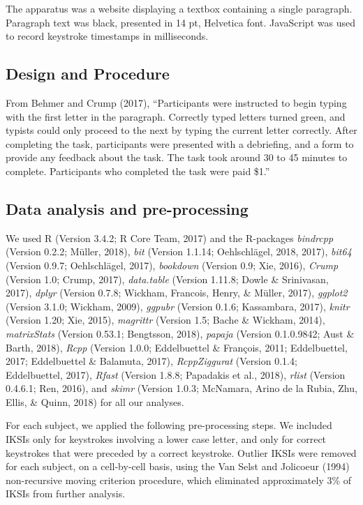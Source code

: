\documentclass[,man,donotrepeattitle,floatsintext]{apa6}
\begin{document}
The apparatus was a website displaying a textbox containing a single paragraph. Paragraph text was black, presented in 14 pt, Helvetica font. JavaScript was used to record keystroke timestamps in milliseconds.

\hypertarget{design-and-procedure}{%
\subsection{Design and Procedure}\label{design-and-procedure}}

From Behmer and Crump (2017), \enquote{Participants were instructed to begin typing with the first letter in the paragraph. Correctly typed letters turned green, and typists could only proceed to the next by typing the current letter correctly. After completing the task, participants were presented with a debriefing, and a form to provide any feedback about the task. The task took around 30 to 45 minutes to complete. Participants who completed the task were paid \$1.}

\hypertarget{data-analysis-and-pre-processing}{%
\subsection{Data analysis and pre-processing}\label{data-analysis-and-pre-processing}}

We used R (Version 3.4.2; R Core Team, 2017) and the R-packages \emph{bindrcpp} (Version 0.2.2; Müller, 2018), \emph{bit} (Version 1.1.14; Oehlschlägel, 2018, 2017), \emph{bit64} (Version 0.9.7; Oehlschlägel, 2017), \emph{bookdown} (Version 0.9; Xie, 2016), \emph{Crump} (Version 1.0; Crump, 2017), \emph{data.table} (Version 1.11.8; Dowle \& Srinivasan, 2017), \emph{dplyr} (Version 0.7.8; Wickham, Francois, Henry, \& Müller, 2017), \emph{ggplot2} (Version 3.1.0; Wickham, 2009), \emph{ggpubr} (Version 0.1.6; Kassambara, 2017), \emph{knitr} (Version 1.20; Xie, 2015), \emph{magrittr} (Version 1.5; Bache \& Wickham, 2014), \emph{matrixStats} (Version 0.53.1; Bengtsson, 2018), \emph{papaja} (Version 0.1.0.9842; Aust \& Barth, 2018), \emph{Rcpp} (Version 1.0.0; Eddelbuettel \& François, 2011; Eddelbuettel, 2017; Eddelbuettel \& Balamuta, 2017), \emph{RcppZiggurat} (Version 0.1.4; Eddelbuettel, 2017), \emph{Rfast} (Version 1.8.8; Papadakis et al., 2018), \emph{rlist} (Version 0.4.6.1; Ren, 2016), and \emph{skimr} (Version 1.0.3; McNamara, Arino de la Rubia, Zhu, Ellis, \& Quinn, 2018) for all our analyses.

For each subject, we applied the following pre-processing steps. We included IKSIs only for keystrokes involving a lower case letter, and only for correct keystrokes that were preceded by a correct keystroke. Outlier IKSIs were removed for each subject, on a cell-by-cell basis, using the Van Selst and Jolicoeur (1994) non-recursive moving criterion procedure, which eliminated approximately 3\% of IKSIs from further analysis.
\end{document}
